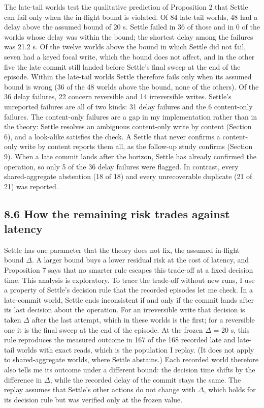 \documentclass[
  10pt,
]{article}
\begin{document}
The late-tail worlds test the qualitative prediction of Proposition 2
that Settle can fail only when the in-flight bound is violated. Of 84
late-tail worlds, 48 had a delay above the assumed bound of 20 s. Settle
failed in 36 of those and in 0 of the worlds whose delay was within the
bound; the shortest delay among the failures was 21.2 s. Of the twelve
worlds above the bound in which Settle did not fail, seven had a keyed
focal write, which the bound does not affect, and in the other five the
late commit still landed before Settle's final sweep at the end of the
episode. Within the late-tail worlds Settle therefore fails only when
its assumed bound is wrong (36 of the 48 worlds above the bound, none of
the others). Of the 36 delay failures, 22 concern reversible and 14
irreversible writes. Settle's unreported failures are all of two kinds:
31 delay failures and the 6 content-only failures. The content-only
failures are a gap in my implementation rather than in the theory:
Settle resolves an ambiguous content-only write by content (Section 6),
and a look-alike satisfies the check. A Settle that never confirms a
content-only write by content reports them all, as the follow-up study
confirms (Section 9). When a late commit lands after the horizon, Settle
has already confirmed the operation, so only 5 of the 36 delay failures
were flagged. In contrast, every shared-aggregate abstention (18 of 18)
and every unrecoverable duplicate (21 of 21) was reported.

\hypertarget{how-the-remaining-risk-trades-against-latency}{%
\subsection*{8.6 How the remaining risk trades against
latency}\label{how-the-remaining-risk-trades-against-latency}}

Settle has one parameter that the theory does not fix, the assumed
in-flight bound \(\Delta\). A larger bound buys a lower residual risk at
the cost of latency, and Proposition 7 says that no smarter rule escapes
this trade-off at a fixed decision time. This analysis is exploratory.
To trace the trade-off without new runs, I use a property of Settle's
decision rule that the recorded episodes let me check. In a late-commit
world, Settle ends inconsistent if and only if the commit lands after
its last decision about the operation. For an irreversible write that
decision is taken \(\Delta\) after the last attempt, which in these
worlds is the first; for a reversible one it is the final sweep at the
end of the episode. At the frozen \(\Delta\) = 20 s, this rule
reproduces the measured outcome in 167 of the 168 recorded late and
late-tail worlds with exact reads, which is the population I replay. (It
does not apply to shared-aggregate worlds, where Settle abstains.) Each
recorded world therefore also tells me its outcome under a different
bound: the decision time shifts by the difference in \(\Delta\), while
the recorded delay of the commit stays the same. The replay assumes that
Settle's other actions do not change with \(\Delta\), which holds for
its decision rule but was verified only at the frozen value.
\end{document}
